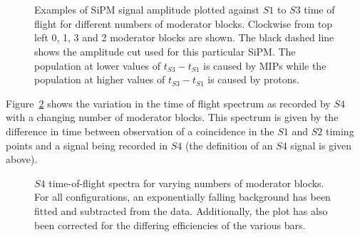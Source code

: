 \begin{figure}[h]
  \begin{minipage}[t]{0.49\textwidth}
    \begin{adjustbox}{max totalsize={\textwidth}, center}
      
    \end{adjustbox} \\
    \begin{adjustbox}{max totalsize={\textwidth}, center}
      
    \end{adjustbox}
  \end{minipage} 
  \begin{minipage}[t]{0.49\textwidth}
    \begin{adjustbox}{max totalsize={\textwidth}, center}
      
    \end{adjustbox} \\
    \begin{adjustbox}{max totalsize={\textwidth}, center}
      
    \end{adjustbox}
  \end{minipage}  
  \caption{Examples of SiPM signal amplitude plotted against $\mathit{S1}$ to $\mathit{S3}$ time of flight for different numbers of moderator blocks. Clockwise from top left 0, 1, 3 and 2 moderator blocks are shown. The black dashed line shows the amplitude cut used for this particular SiPM. The population at lower values of $t_{\mathit{S3}}-t_{\mathit{S1}}$ is caused by MIPs while the population at higher values of $t_{\mathit{S3}}-t_{\mathit{S1}}$ is caused by protons.}
  \label{fig:TvsA}
\end{figure}

Figure~\ref{fig:s4tof} shows the variation in the time of flight spectrum as recorded by $\mathit{S4}$ with a changing number of moderator blocks.
This spectrum is given by the difference in time between observation of a coincidence in the $\mathit{S1}$ and $\mathit{S2}$ timing points and a signal being recorded in $\mathit{S4}$ (the definition of an $\mathit{S4}$ signal is given above).

\begin{figure}[h]
  \begin{adjustbox}{max totalsize={.8\textwidth}{.5\textheight},center}
    
  \end{adjustbox}
  \caption{$\mathit{S4}$ time-of-flight spectra for varying numbers of moderator blocks. For all configurations, an exponentially falling background has been fitted and subtracted from the data. Additionally, the plot has also been corrected for the differing efficiencies of the various bars.}
  \label{fig:s4tof}	
\end{figure}

